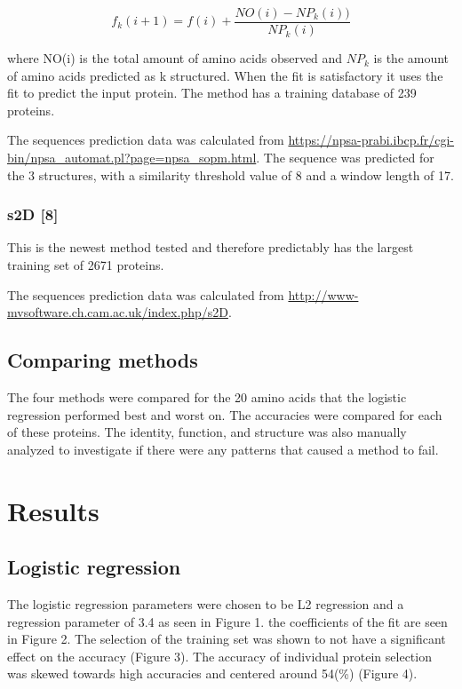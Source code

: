 \documentclass{article}
\begin{document}
$$f_k(i+1) = f(i) + \frac{NO(i)-NP_k(i))}{NP_k(i)}$$

where NO(i) is the total amount of amino acids observed and $NP_k$ is the amount of amino acids predicted as k structured. When the fit is satisfactory it uses the fit to predict the input protein. The method has a training database of 239 proteins.

The sequences prediction data was calculated from \url{https://npsa-prabi.ibcp.fr/cgi-bin/npsa_automat.pl?page=npsa_sopm.html}. The sequence was predicted for the 3 structures, with a similarity threshold value of 8 and a window length of 17.

\subsubsection{s2D [8]}

This is the newest method tested and therefore predictably has the largest training set of 2671 proteins.

The sequences prediction data was calculated from \url{http://www-mvsoftware.ch.cam.ac.uk/index.php/s2D}.

\subsection{Comparing methods}
The four methods were compared for the 20 amino acids that the logistic regression performed best and worst on. The accuracies were compared for each of these proteins. The identity, function, and structure was also manually analyzed to investigate if there were any patterns that caused a method to fail.


\section{Results}

\subsection{Logistic regression}

The logistic regression parameters were chosen to be L2 regression and a regression parameter of 3.4 as seen in Figure 1. the coefficients of the fit are seen in Figure 2. The selection of the training set was shown to not have a significant effect on the accuracy (Figure 3). The accuracy of individual protein selection was skewed towards high accuracies and centered around 54(\%) (Figure 4).
\end{document}
